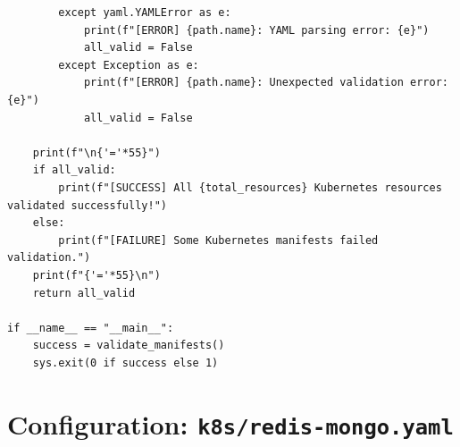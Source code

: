 \documentclass[12pt,a4paper]{report}
\begin{document}
\begin{lstlisting}
        except yaml.YAMLError as e:
            print(f"[ERROR] {path.name}: YAML parsing error: {e}")
            all_valid = False
        except Exception as e:
            print(f"[ERROR] {path.name}: Unexpected validation error: {e}")
            all_valid = False

    print(f"\n{'='*55}")
    if all_valid:
        print(f"[SUCCESS] All {total_resources} Kubernetes resources validated successfully!")
    else:
        print(f"[FAILURE] Some Kubernetes manifests failed validation.")
    print(f"{'='*55}\n")
    return all_valid

if __name__ == "__main__":
    success = validate_manifests()
    sys.exit(0 if success else 1)
\end{lstlisting}


\section{Configuration: \texttt{k8s/redis-mongo.yaml}}
\end{document}

